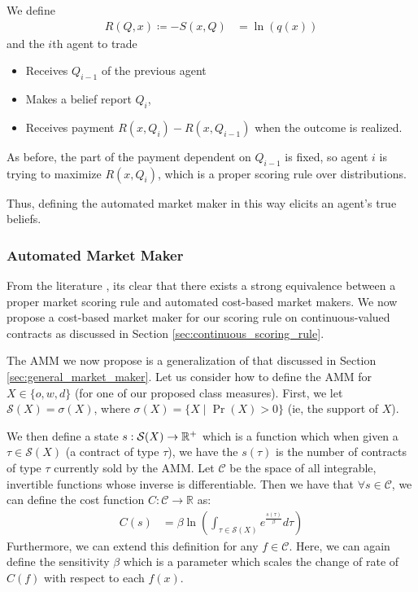 We define
\begin{align}
R(Q, x) \coloneqq -S(x,Q) &= \ln(q(x))
\end{align}
and the $i$th agent to trade \begin{itemize}
\item Receives $Q_{i-1}$ of the previous agent
\item Makes a belief report $Q_i$,
\item Receives payment $R(x,Q_i)-R(x,Q_{i-1})$ when the outcome is realized.
\end{itemize}

As before, the part of the payment dependent on $Q_{i-1}$ is fixed, so agent $i$ is trying to maximize $R(x,Q_i)$, which is a proper scoring rule over distributions.

Thus, defining the automated market maker in this way elicits an agent's true beliefs.

\subsubsection{Automated Market Maker}
\label{sec:continuous_maker}
From the literature \cite{cost-based}, its clear that there exists a strong equivalence between a proper market scoring rule and automated cost-based market makers. We now propose a cost-based market maker for our scoring rule on continuous-valued contracts as discussed in Section \ref{sec:continuous_scoring_rule}. 

The AMM we now propose is a generalization of that discussed in Section \ref{sec:general_market_maker}. Let us consider how to define the AMM for  $X \in \{o,w,d\}$ (for one of our proposed class measures). First, we let $\mathcal{S}(X) = \sigma(X)$, where $\sigma(X) = \{X \mid \Pr(X) > 0 \}$ (ie, the support of $X$).

We then define a state $s : \mathcal{S}(X) \to \mathbb{R}^+$ which is a function which when given a $\tau \in \mathcal{S}(X)$ (a contract of type $\tau$), we have the $s(\tau)$ is the number of contracts of type $\tau$ currently sold by the AMM. Let $\mathcal{C}$ be the space of all integrable, invertible functions whose inverse is differentiable. Then we have that $\forall s \in \mathcal{C}$, we can define the cost function $C: \mathcal{C} \to \mathbb{R}$ as:
\begin{align}
C(s) &= \beta \ln \left( \int_{\tau \in \mathcal{S}(X)} e^{\frac{s(\tau)}{\beta}} d\tau \right)
\end{align}
Furthermore, we can extend this definition for any $f \in \mathcal{C}$. Here, we can again define the sensitivity $\beta$ which is a parameter which scales the change of rate of $C(f)$ with respect to each $f(x)$. 


